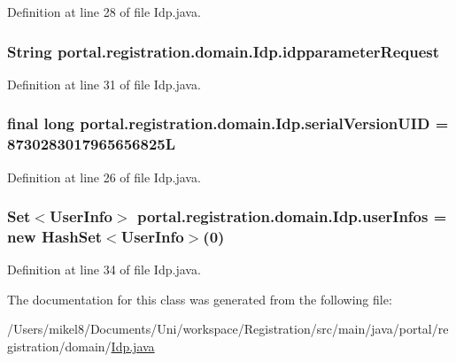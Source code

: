 Definition at line 28 of file Idp.java.

\hypertarget{classportal_1_1registration_1_1domain_1_1Idp_acd9b443db5b19445703d63d4f340cf9a}{
\subsubsection[{idpparameterRequest}]{\setlength{\rightskip}{0pt plus 5cm}String {\bf portal.registration.domain.Idp.idpparameterRequest}}}
\label{classportal_1_1registration_1_1domain_1_1Idp_acd9b443db5b19445703d63d4f340cf9a}


Definition at line 31 of file Idp.java.

\hypertarget{classportal_1_1registration_1_1domain_1_1Idp_ad23f25650a51690bef88c89d63a6e4b9}{
\subsubsection[{serialVersionUID}]{\setlength{\rightskip}{0pt plus 5cm}final long {\bf portal.registration.domain.Idp.serialVersionUID} = 8730283017965656825L}}
\label{classportal_1_1registration_1_1domain_1_1Idp_ad23f25650a51690bef88c89d63a6e4b9}


Definition at line 26 of file Idp.java.

\hypertarget{classportal_1_1registration_1_1domain_1_1Idp_a888963b67e250b7810486a9566d90e62}{
\subsubsection[{userInfos}]{\setlength{\rightskip}{0pt plus 5cm}Set$<${\bf UserInfo}$>$ {\bf portal.registration.domain.Idp.userInfos} = new HashSet$<${\bf UserInfo}$>$(0)}}
\label{classportal_1_1registration_1_1domain_1_1Idp_a888963b67e250b7810486a9566d90e62}


Definition at line 34 of file Idp.java.



The documentation for this class was generated from the following file:\begin{DoxyCompactItemize}
\item 
/Users/mikel8/Documents/Uni/workspace/Registration/src/main/java/portal/registration/domain/\hyperlink{Idp_8java}{Idp.java}\end{DoxyCompactItemize}
